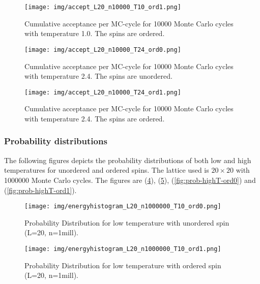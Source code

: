 \documentclass{article}
\begin{document}
  \begin{figure}[ht]
      \centering
      \texttt{[image: img/accept\_L20\_n10000\_T10\_ord1.png]}
      \caption{Cumulative acceptance per MC-cycle for 10000 Monte Carlo cycles with temperature 1.0. The spins are ordered. }
      \label{fig:accept_L20_n10000_T1.0_ord1}
    \end{figure}

  \begin{figure}[ht]
      \centering
      \texttt{[image: img/accept\_L20\_n10000\_T24\_ord0.png]}
      \caption{Cumulative acceptance per MC-cycle for 10000 Monte Carlo cycles with temperature 2.4. The spins are unordered. }
      \label{fig:accept_L20_n10000_T2.4_ord0}
    \end{figure}

  \begin{figure}[ht]
      \centering
      \texttt{[image: img/accept\_L20\_n10000\_T24\_ord1.png]}
      \caption{Cumulative acceptance per MC-cycle for 10000 Monte Carlo cycles with temperature 2.4. The spins are ordered. }
      \label{fig:accept_L20_n10000_T2.4_ord1}
    \end{figure}

\subsubsection{Probability distributions} \label{sec:probabilitydistributions}

The following figures depicts the probability distributions of both low and high temperatures for unordered and ordered spins. The lattice used is $20 \times 20$ with 1000000 Monte Carlo cycles. The figures are (\ref{fig:prob-lowT-ord0}), (\ref{fig:prob-lowT-ord1}), (\ref{fig:prob-highT-ord0}) and (\ref{fig:prob-highT-ord1}). \\

  \begin{figure}[ht]
      \centering
      \texttt{[image: img/energyhistogram\_L20\_n1000000\_T10\_ord0.png]}
      \caption{Probability Distribution for low temperature with unordered spin (L=20, n=1mill).}
      \label{fig:prob-lowT-ord0}
    \end{figure}

  \begin{figure}[ht]
      \centering
      \texttt{[image: img/energyhistogram\_L20\_n1000000\_T10\_ord1.png]}
      \caption{Probability Distribution for low temperature with ordered spin (L=20, n=1mill).}
      \label{fig:prob-lowT-ord1}
    \end{figure}
\end{document}

